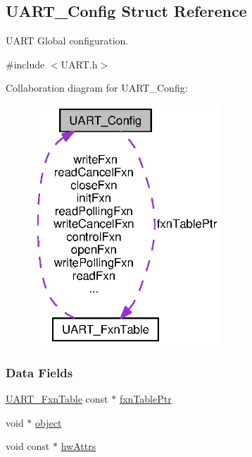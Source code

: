 \subsection{U\-A\-R\-T\-\_\-\-Config Struct Reference}
\label{struct_u_a_r_t___config}


U\-A\-R\-T Global configuration.  




{\ttfamily \#include $<$U\-A\-R\-T.\-h$>$}



Collaboration diagram for U\-A\-R\-T\-\_\-\-Config\-:
\nopagebreak
\begin{figure}[H]
\begin{center}
\leavevmode
\includegraphics[width=199pt]{struct_u_a_r_t___config__coll__graph}
\end{center}
\end{figure}
\subsubsection*{Data Fields}
\begin{DoxyCompactItemize}
\item 
\hyperlink{struct_u_a_r_t___fxn_table}{U\-A\-R\-T\-\_\-\-Fxn\-Table} const $\ast$ \hyperlink{struct_u_a_r_t___config_a9e8073b7f55a5b3bc70d377e3b3f1375}{fxn\-Table\-Ptr}
\item 
void $\ast$ \hyperlink{struct_u_a_r_t___config_a6472bcf07cd2c8ed0045fe01a934f583}{object}
\item 
void const $\ast$ \hyperlink{struct_u_a_r_t___config_ad0baf0ebc820bca98fc7fbd089d1c55c}{hw\-Attrs}
\end{DoxyCompactItemize}


